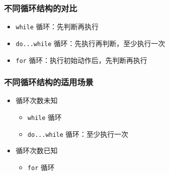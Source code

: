 \begin{frame}[fragile]
    \frametitle{不同循环结构的对比}

    \begin{itemize}
        \item<1-> \lstinline|while| 循环：先判断再执行

             {
                
            }

        \item<2-> \lstinline|do...while| 循环：先执行再判断，至少执行一次

             {
                
            }

        \item<3-> \lstinline|for| 循环：执行初始动作后，先判断再执行

             {
                
            }

    \end{itemize}
\end{frame}

\begin{frame}[fragile]
    \frametitle{不同循环结构的适用场景}

    \begin{itemize}
        \item<1-> 循环次数未知

            \begin{itemize}
                \item \lstinline|while| 循环
                \item \lstinline|do...while| 循环：至少执行一次
            \end{itemize}

        \item<2-> 循环次数已知

            \begin{itemize}
                \item \lstinline|for| 循环
            \end{itemize}

    \end{itemize}
\end{frame}

